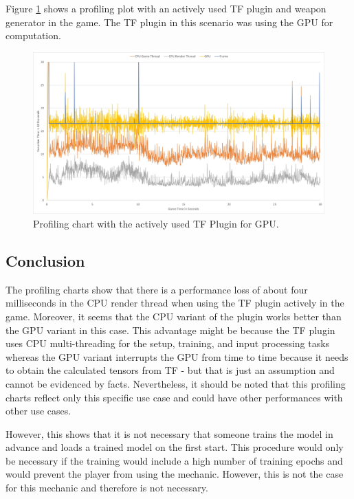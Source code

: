 \documentclass[MGS,Master,english]{twbook}%
\begin{document}
Figure \ref{scenario::profiling_GPU} shows a profiling plot with an actively used \ac{TF} plugin and weapon generator in the game. The \ac{TF} plugin in this scenario was using the \ac{GPU} for computation.
\begin{figure}[!ht]
	\centering
	\includegraphics[width=1.0\linewidth]{PICs/Profiling/tf_gpu}
	\caption{Profiling chart with the actively used \ac{TF} Plugin for \ac{GPU}.} \label{scenario::profiling_GPU}
\end{figure}

\subsection{Conclusion}
The profiling charts show that there is a performance loss of about four milliseconds in the \ac{CPU} render thread when using the \ac{TF} plugin actively in the game. Moreover, it seems that the \ac{CPU} variant of the plugin works better than the \ac{GPU} variant in this case. This advantage might be because the \ac{TF} plugin uses \ac{CPU} multi-threading for the setup, training, and input processing tasks whereas the \ac{GPU} variant interrupts the \ac{GPU} from time to time because it needs to obtain the calculated tensors from \ac{TF} - but that is just an assumption and cannot be evidenced by facts. Nevertheless, it should be noted that this profiling charts reflect only this specific use case and could have other performances with other use cases. 

However, this shows that it is not necessary that someone trains the model in advance and loads a trained model on the first start. This procedure would only be necessary if the training would include a high number of training epochs and would prevent the player from using the mechanic. However, this is not the case for this mechanic and therefore is not necessary.
\end{document}
